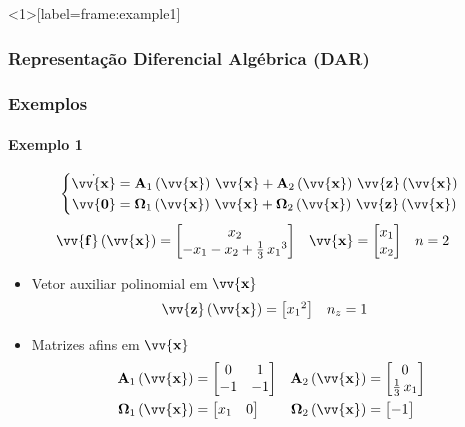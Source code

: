 \documentclass{beamer}
\newcommand*{\Round}[1]{\left(#1\right)}
\newcommand*{\Prod}{\,}
\newcommand*{\Bold}[1]{\boldsymbol{\mathbf{#1}}}
\newcommand*{\Matr}[1]{\Bold{#1}}
\newcommand*{\Vect}[1]{\vv{\Bold{#1}}}
\renewcommand{\Prod}{\,}
\begin{document}
\begin{frame}<1>[label={frame:example1}]\frametitle<1>{Representação Diferencial Algébrica (DAR)}\frametitle<2>{Exemplos}\framesubtitle{Exemplo 1}
  \vspace{-20pt}
  \begin{equation}
    \left\{\begin{aligned}
      \dot{\Vect{x}} &= \Matr{A}_1\Round{\Vect{x}} \Prod \Vect{x} + \Matr{A}_2\Round{\Vect{x}} \Prod \Vect{z}\Round{\Vect{x}}
      \\
      \Vect{0} &= \Matr{\Omega}_1\Round{\Vect{x}} \Prod \Vect{x} + \Matr{\Omega}_2\Round{\Vect{x}} \Prod \Vect{z}\Round{\Vect{x}}
    \end{aligned}\right.
  \end{equation}
  \begin{align}
    \Vect{f}\Round{\Vect{x}}
    &= \begin{bmatrix}
      x_2
      \\
      -x_1 -x_2 + \frac{1}{3} \Prod {x_1}^3
    \end{bmatrix}
    &
    \Vect{x}
    &= \begin{bmatrix} x_1 \\ x_2 \end{bmatrix}
    &
    n &= 2
  \end{align}
  \begin{itemize}
    \item Vetor auxiliar polinomial em $\Vect{x}$
    \begin{align}
      \Vect{z}\Round{\Vect{x}} &= \begin{bmatrix} {x_1}^2 \end{bmatrix}
      &
      n_z &= 1
    \end{align}
    \item Matrizes afins em $\Vect{x}$
    \begin{align}
      \Matr{A}_1\Round{\Vect{x}}
      &= \begin{bmatrix}
         0 &  1 \\
        -1 & -1 \\
      \end{bmatrix}
      &
      \Matr{A}_2\Round{\Vect{x}}
      &= \begin{bmatrix}
        0                     \\
        \frac{1}{3} \Prod x_1 \\
      \end{bmatrix}
      \\
      \Matr{\Omega}_1\Round{\Vect{x}}
      &= \begin{bmatrix}
        x_1 & 0 \\
      \end{bmatrix}
      &
      \Matr{\Omega}_2\Round{\Vect{x}}
      &= \begin{bmatrix}
        -1 \\
      \end{bmatrix}
    \end{align}
  \end{itemize}
\end{frame}
\end{document}
